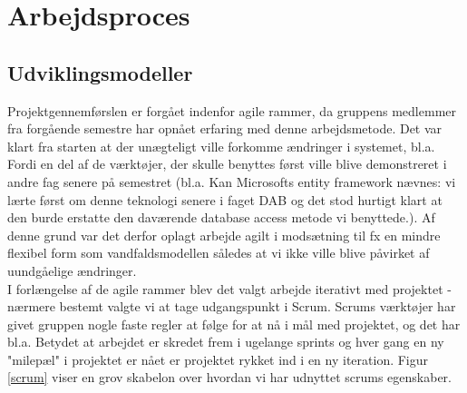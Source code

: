 \section{Arbejdsproces}

\subsection{Udviklingsmodeller}
Projektgennemførslen er forgået indenfor agile rammer, da gruppens medlemmer fra forgående semestre har opnået erfaring med denne arbejdsmetode. Det var klart fra starten at der unægteligt ville forkomme ændringer i systemet, bl.a. Fordi en del af de værktøjer, der skulle benyttes først ville blive demonstreret i andre fag senere på semestret (bl.a. Kan Microsofts entity framework nævnes: vi lærte først om denne teknologi senere i faget DAB og det stod hurtigt klart at den burde erstatte den daværende database access metode vi benyttede.). Af denne grund var det derfor oplagt arbejde agilt i modsætning til fx en mindre flexibel form som vandfaldsmodellen således at vi ikke ville blive påvirket af uundgåelige ændringer. \\
I forlængelse af de agile rammer blev det valgt arbejde iterativt med projektet - nærmere bestemt valgte vi at tage udgangspunkt i Scrum. Scrums værktøjer har givet gruppen nogle faste regler at følge for at nå i mål med projektet, og det har bl.a. Betydet at arbejdet er skredet frem i ugelange sprints og hver gang en ny "milepæl" i projektet er nået er projektet rykket ind i en ny iteration. Figur \ref{scrum} viser en grov skabelon over hvordan vi har udnyttet scrums egenskaber. 



